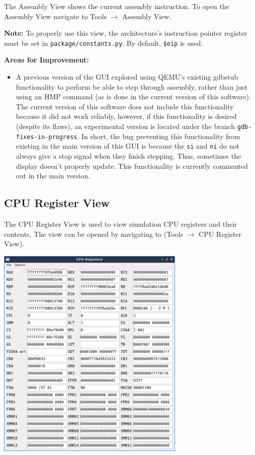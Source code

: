 \documentclass{article}
\newcommand{\code}[1]{\texttt{#1}}
\begin{document}
The Assembly View shows the current assembly instruction. To open the Assembly View navigate to Tools $\rightarrow$ Assembly View. \par
\textbf{Note:} To properly use this view, the architecture's instruction pointer register must be set in \code{package/constants.py}. By default, \code{\$eip} is used.\par
\textbf{Areas for Improvement:}
\begin{itemize}
    \item A previous version of the GUI explored using QEMU's existing gdbstub functionality to perform be able to step through assembly, rather than just using an HMP command (as is done in the current version of this software). The current version of this software does not include this functionality because it did not work reliably, however, if this functionality is desired (despite its flaws), an experimental version is located under the branch \code{gdb-fixes-in-progress}. In short, the bug preventing this functionality from existing in the main version of this GUI is because the \code{si} and \code{ni} do not always give a stop signal when they finish stepping. Thus, sometimes the display doesn't properly update. This functionality is currently commented out in the main version.
\end{itemize}

\subsection{CPU Register View}
The CPU Register View is used to view simulation CPU registers and their contents. The view can be opened by navigating to (Tools $\rightarrow$ CPU Register View). 

\begin{center}
    \includegraphics[width=90mm]{images/registers_fancy.jpg}
\end{center}
\end{document}
